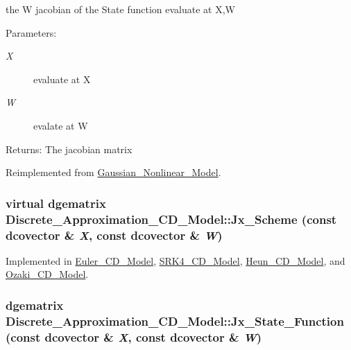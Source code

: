 the W jacobian of the State function evaluate at X,W 

\begin{Desc}
\item[Parameters:]
\begin{description}
\item[{\em X}]evaluate at X \item[{\em W}]evalate at W\end{description}
\end{Desc}
\begin{Desc}
\item[Returns:]The jacobian matrix \end{Desc}


Reimplemented from \hyperlink{class_gaussian___nonlinear___model_1c6710cedf6317e07b7b2a48f41f5442}{Gaussian\_\-Nonlinear\_\-Model}.\hypertarget{class_discrete___approximation___c_d___model_7a3dcae055d90be0b8a231eff961e2a2}{
\subsubsection[{Jx\_\-Scheme}]{\setlength{\rightskip}{0pt plus 5cm}virtual dgematrix Discrete\_\-Approximation\_\-CD\_\-Model::Jx\_\-Scheme (const dcovector \& {\em X}, \/  const dcovector \& {\em W})}}
\label{class_discrete___approximation___c_d___model_7a3dcae055d90be0b8a231eff961e2a2}




Implemented in \hyperlink{class_euler___c_d___model_31ea181a55cb1b348bd483f5fe077c50}{Euler\_\-CD\_\-Model}, \hyperlink{class_s_r_k4___c_d___model_2e0543a20a7ba52958606bda265413bd}{SRK4\_\-CD\_\-Model}, \hyperlink{class_heun___c_d___model_322cd83c0b81c2ed81483f42123f08e6}{Heun\_\-CD\_\-Model}, and \hyperlink{class_ozaki___c_d___model_6c4415b26674d1fc7b5e4f7499f35dd9}{Ozaki\_\-CD\_\-Model}.\hypertarget{class_discrete___approximation___c_d___model_b0ba3cda373913f6a1df4a417200218a}{
\subsubsection[{Jx\_\-State\_\-Function}]{\setlength{\rightskip}{0pt plus 5cm}dgematrix Discrete\_\-Approximation\_\-CD\_\-Model::Jx\_\-State\_\-Function (const dcovector \& {\em X}, \/  const dcovector \& {\em W})}}
\label{class_discrete___approximation___c_d___model_b0ba3cda373913f6a1df4a417200218a}


